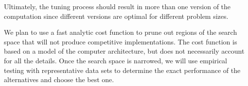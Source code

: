 \documentclass[11pt]{article}
\begin{document}
Ultimately, the tuning process should result in more than one version of the computation since different versions are optimal for different problem sizes.

We plan to use a fast analytic cost function to prune out regions of the search space that will not produce competitive implementations. The cost function is based on a model of the computer architecture, but does not necessarily account for all the details.  Once the search space is narrowed, we will use empirical testing with representative data sets to determine the exact performance of the alternatives and choose the best one.

\singlespacing


\end{document}
